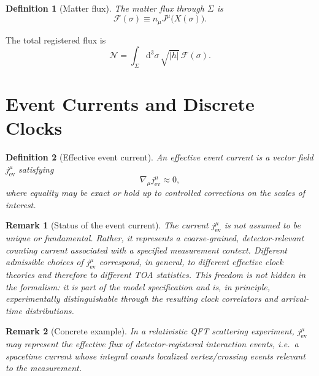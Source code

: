 \documentclass[pdflatex,sn-mathphys-num]{sn-jnl}
\theoremstyle{thmstylethree}
\newtheorem{definition}{Definition}[section]
\theoremstyle{thmstyleone}
\theoremstyle{thmstyletwo}
\newtheorem{remark}{Remark}[section]
\numberwithin{equation}{section}
\newcommand{\dd}{\mathrm{d}}
\newcommand{\Sig}{\Sigma}
\newcommand{\Jev}{j^\mu_{\mathrm{ev}}}
\newcommand{\F}{\mathcal{F}}
\begin{document}
    \begin{definition}[Matter flux]
The matter flux through $\Sig$ is
\begin{equation}
    \F(\sigma) \equiv n_\mu J^\mu\big(X(\sigma)\big).
\end{equation}
    \end{definition}
    
    The total registered flux is
    \begin{equation}
        \mathcal{N} = \int_\Sig \dd^3\sigma\,\sqrt{|h|}\,\F(\sigma).
    \end{equation}

    \section{Event Currents and Discrete Clocks}\label{sec:eventcurrents}
    
    \begin{definition}[Effective event current]
An \emph{effective event current} is a vector field $\Jev$ satisfying
\begin{equation}
    \nabla_\mu \Jev \approx 0 ,
\end{equation}
where equality may be exact or hold up to controlled corrections on the scales of interest.
    \end{definition}
    
    \begin{remark}[Status of the event current]
The current $j^\mu_{\mathrm{ev}}$ is not assumed to be unique or fundamental. Rather, it represents a coarse-grained, detector-relevant counting current associated with a specified measurement context. Different admissible choices of $j^\mu_{\mathrm{ev}}$ correspond, in general, to different effective clock theories and therefore to different TOA statistics. This freedom is not hidden in the formalism: it is part of the model specification and is, in principle, experimentally distinguishable through the resulting clock correlators and arrival-time distributions.
    \end{remark}
    
    \begin{remark}[Concrete example]
In a relativistic QFT scattering experiment, $j^\mu_{\mathrm{ev}}$ may represent the effective flux of detector-registered interaction events, i.e.\ a spacetime current whose integral counts localized vertex/crossing events relevant to the measurement.
    \end{remark}
    
\end{document}

